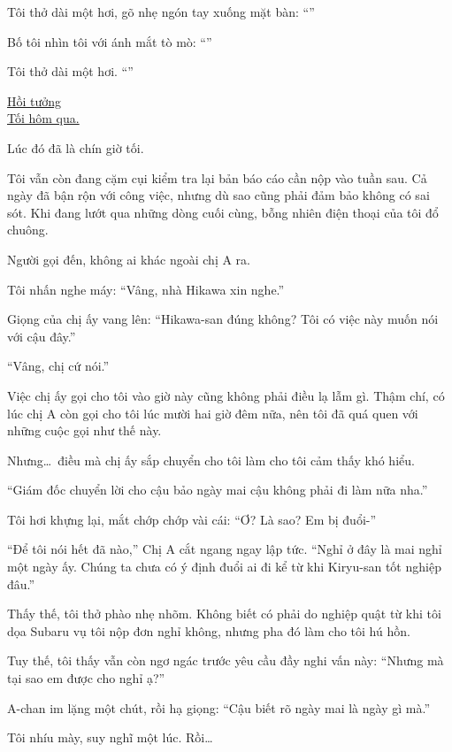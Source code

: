\documentclass[../main.tex]{subfiles}
\begin{document}
Tôi thở dài một hơi, gõ nhẹ ngón tay xuống mặt bàn: ``''

Bố tôi nhìn tôi với ánh mắt tò mò: ``''

Tôi thở dài một hơi. ``''

\begin{center}
    \uline{Hồi tưởng\\Tối hôm qua.}
\end{center}

Lúc đó đã là chín giờ tối.

Tôi vẫn còn đang cặm cụi kiểm tra lại bản báo cáo cần nộp vào tuần sau. Cả ngày đã bận rộn với công việc, nhưng dù sao cũng phải đảm bảo không có sai sót. Khi đang lướt qua những dòng cuối cùng, bỗng nhiên điện thoại của tôi đổ chuông.

Người gọi đến, không ai khác ngoài chị A ra.

Tôi nhấn nghe máy: ``Vâng, nhà Hikawa xin nghe.''

Giọng của chị ấy vang lên: ``Hikawa-san đúng không? Tôi có việc này muốn nói với cậu đây.''

``Vâng, chị cứ nói.''

Việc chị ấy gọi cho tôi vào giờ này cũng không phải điều lạ lẫm gì. Thậm chí, có lúc chị A còn gọi cho tôi lúc mười hai giờ đêm nữa, nên tôi đã quá quen với những cuộc gọi như thế này.

Nhưng\dots\ điều mà chị ấy sắp chuyển cho tôi làm cho tôi cảm thấy khó hiểu.

``Giám đốc chuyển lời cho cậu bảo ngày mai cậu không phải đi làm nữa nha.''

Tôi hơi khựng lại, mắt chớp chớp vài cái: ``Ơ? Là sao? Em bị đuổi-''

``Để tôi nói hết đã nào,'' Chị A cắt ngang ngay lập tức. ``Nghỉ ở đây là mai nghỉ một ngày ấy. Chúng ta chưa có ý định đuổi ai đi kể từ khi Kiryu-san tốt nghiệp đâu.''

Thấy thế, tôi thở phào nhẹ nhõm. Không biết có phải do nghiệp quật từ khi tôi dọa Subaru vụ tôi nộp đơn nghỉ không, nhưng pha đó làm cho tôi hú hồn.

Tuy thế, tôi thấy vẫn còn ngơ ngác trước yêu cầu đầy nghi vấn này: ``Nhưng mà tại sao em được cho nghỉ ạ?''

A-chan im lặng một chút, rồi hạ giọng: ``Cậu biết rõ ngày mai là ngày gì mà.''

Tôi nhíu mày, suy nghĩ một lúc. Rồi\dots
\end{document}
